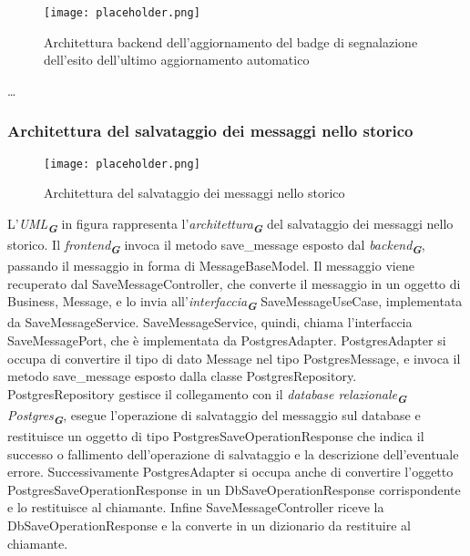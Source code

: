 \begin{figure}[h]
    \centering
    \texttt{[image: placeholder.png]}
    \caption{Architettura backend dell’aggiornamento del badge di segnalazione dell’esito dell’ultimo aggiornamento automatico}
\end{figure}

\dots

\newpage


\subsubsection{Architettura del salvataggio dei messaggi nello storico}
\label{sec:architettura_salvataggio_messaggi_storico}

\begin{figure}[h]
    \centering
    \texttt{[image: placeholder.png]}
    \caption{Architettura del salvataggio dei messaggi nello storico}
\end{figure}

L'\emph{UML}\textsubscript{\textbf{\textit{G}}} in figura rappresenta l'\emph{architettura}\textsubscript{\textbf{\textit{G}}} del salvataggio dei messaggi nello storico.
Il \emph{frontend}\textsubscript{\textbf{\textit{G}}} invoca il metodo save\_message esposto dal \emph{backend}\textsubscript{\textbf{\textit{G}}}, passando il messaggio in forma di MessageBaseModel.
Il messaggio viene recuperato dal SaveMessageController, che converte il messaggio in un oggetto di Business, Message, e lo invia all'\emph{interfaccia}\textsubscript{\textbf{\textit{G}}} SaveMessageUseCase, implementata da SaveMessageService.
SaveMessageService, quindi, chiama l'interfaccia SaveMessagePort, che è implementata da PostgresAdapter.
PostgresAdapter si occupa di convertire il tipo di dato Message nel tipo PostgresMessage, e invoca il metodo save\_message esposto dalla classe PostgresRepository.
PostgresRepository gestisce il collegamento con il \emph{database relazionale}\textsubscript{\textbf{\textit{G}}} \emph{Postgres}\textsubscript{\textbf{\textit{G}}},
esegue l'operazione di salvataggio del messaggio sul database e restituisce un oggetto di tipo PostgresSaveOperationResponse che indica il successo o fallimento dell'operazione di salvataggio e la descrizione dell'eventuale errore.
Successivamente PostgresAdapter si occupa anche di convertire l'oggetto PostgresSaveOperationResponse in un DbSaveOperationResponse corrispondente e lo restituisce al chiamante.
Infine SaveMessageController riceve la DbSaveOperationResponse e la converte in un dizionario da restituire al chiamante.

